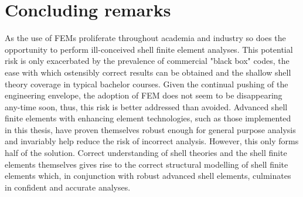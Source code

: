 \section{Concluding remarks}

As the use of FEMs proliferate throughout academia and industry so does the opportunity to perform ill-conceived shell finite element analyses. This potential risk is only exacerbated by the prevalence of commercial "black box" codes, the ease with which ostensibly correct results can be obtained and the shallow shell theory coverage in typical bachelor courses. Given the continual pushing of the engineering envelope, the adoption of FEM does not seem to be disappearing any-time soon, thus, this risk is better addressed than avoided. Advanced shell finite elements with enhancing element technologies, such as those implemented in this thesis, have proven themselves robust enough for general purpose analysis and invariably help reduce the risk of incorrect analysis. However, this only forms half of the solution. Correct understanding of shell theories and the shell finite elements themselves gives rise to the correct structural modelling of shell finite elements which, in conjunction with robust advanced shell elements, culminates in confident and accurate analyses.